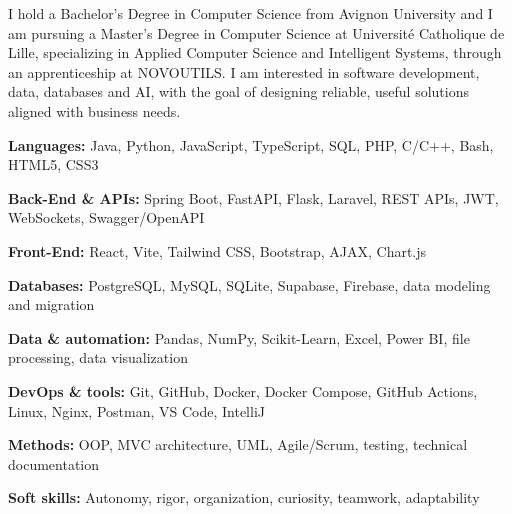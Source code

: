 \documentclass[10pt]{article}
\begin{document}
\color{darktext}\fontsize{9.3}{11.1}\selectfont


{\fontsize{9.6}{11.6}\selectfont
I hold a Bachelor's Degree in Computer Science from Avignon University and I am pursuing a Master's Degree in Computer Science at Université Catholique de Lille, specializing in Applied Computer Science and Intelligent Systems, through an apprenticeship at NOVOUTILS\@. I am interested in software development, data, databases and AI\@, with the goal of designing reliable, useful solutions aligned with business needs.\par}

\textbf{Languages:} Java, Python, JavaScript, TypeScript, SQL, PHP, C/C++, Bash, HTML5, CSS3\par
\textbf{Back-End \& APIs:} Spring Boot, FastAPI, Flask, Laravel, REST APIs, JWT, WebSockets, Swagger/OpenAPI\par
\textbf{Front-End:} React, Vite, Tailwind CSS, Bootstrap, AJAX, Chart.js\par
\textbf{Databases:} PostgreSQL, MySQL, SQLite, Supabase, Firebase, data modeling and migration\par
\textbf{Data \& automation:} Pandas, NumPy, Scikit-Learn, Excel, Power BI, file processing, data visualization\par
\textbf{DevOps \& tools:} Git, GitHub, Docker, Docker Compose, GitHub Actions, Linux, Nginx, Postman, VS Code, IntelliJ\par
\textbf{Methods:} OOP, MVC architecture, UML, Agile/Scrum, testing, technical documentation\par
\textbf{Soft skills:} Autonomy, rigor, organization, curiosity, teamwork, adaptability\par
\end{document}
